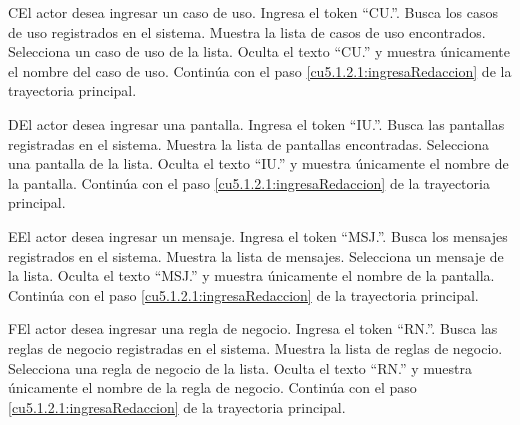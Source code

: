  \begin{UCtrayectoriaA}{C}{El actor desea ingresar un caso de uso.}
  	\UCpaso[\UCactor] Ingresa el token ``CU.''.	
 	\UCpaso[\UCsist] Busca los casos de uso registrados en el sistema. 
 	\UCpaso[\UCsist] Muestra la lista de casos de uso encontrados.
 	\UCpaso[\UCactor] Selecciona un caso de uso de la lista.
  	\UCpaso[\UCsist] Oculta el texto ``CU.'' y muestra únicamente el nombre del caso de uso.
    \UCpaso[] Continúa con el paso \ref{cu5.1.2.1:ingresaRedaccion} de la trayectoria principal.
 \end{UCtrayectoriaA}

 \begin{UCtrayectoriaA}{D}{El actor desea ingresar una pantalla.}
 	\UCpaso[\UCactor] Ingresa el token ``IU.''.	
 	\UCpaso[\UCsist] Busca las pantallas registradas en el sistema. 
 	\UCpaso[\UCsist] Muestra la lista de pantallas encontradas.
 	\UCpaso[\UCactor] Selecciona una pantalla de la lista.
  	\UCpaso[\UCsist] Oculta el texto ``IU.'' y muestra únicamente el nombre de la pantalla.
    \UCpaso[] Continúa con el paso \ref{cu5.1.2.1:ingresaRedaccion} de la trayectoria principal.
 \end{UCtrayectoriaA}

 \begin{UCtrayectoriaA}{E}{El actor desea ingresar un mensaje.}
 	 \UCpaso[\UCactor] Ingresa el token ``MSJ.''.	
 	\UCpaso[\UCsist] Busca los mensajes registrados en el sistema. 
 	\UCpaso[\UCsist] Muestra la lista de mensajes.
 	\UCpaso[\UCactor] Selecciona un mensaje de la lista.
  	\UCpaso[\UCsist] Oculta el texto ``MSJ.'' y muestra únicamente el nombre de la pantalla.
    \UCpaso[] Continúa con el paso \ref{cu5.1.2.1:ingresaRedaccion} de la trayectoria principal.
 \end{UCtrayectoriaA}

 \begin{UCtrayectoriaA}{F}{El actor desea ingresar una regla de negocio.}
 	\UCpaso[\UCactor] Ingresa el token ``RN.''.	
 	\UCpaso[\UCsist] Busca las reglas de negocio registradas en el sistema. 
 	\UCpaso[\UCsist] Muestra la lista de reglas de negocio.
 	\UCpaso[\UCactor] Selecciona una regla de negocio de la lista.
  	\UCpaso[\UCsist] Oculta el texto ``RN.'' y muestra únicamente el nombre de la regla de negocio.
    \UCpaso[] Continúa con el paso \ref{cu5.1.2.1:ingresaRedaccion} de la trayectoria principal.
 \end{UCtrayectoriaA}

